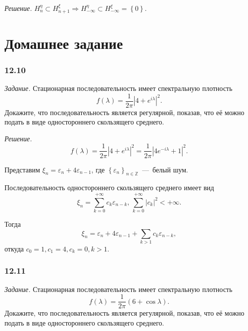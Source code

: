 \textit{Решение.}
$H_n^{ \eta } \subset H_{n + 1}^{ \xi } \Rightarrow
  H_{-\infty }^{ \eta } \subset H_{-\infty }^{ \xi } = \left\{ 0 \right\} $.

\section*{Домашнее задание}

\subsubsection*{12.10}

\textit{Задание.}
Стационарная последовательность имеет спектральную плотность
\begin{equation*}
  f \left( \lambda \right) =
  \frac{1}{2 \pi } \left| 4 + e^{i \lambda } \right|^2.
\end{equation*}
Докажите, что последовательность является регулярной, показав,
что её можно подать в виде одностороннего скользящего среднего.

\textit{Решение.}
\begin{equation*}
  f \left( \lambda \right) =
  \frac{1}{2 \pi } \left| 4 + e^{i \lambda } \right|^2 =
  \frac{1}{2 \pi } \left| 4e^{-i \lambda } + 1 \right|^2.
\end{equation*}

Представим $ \xi_n = \varepsilon_n + 4 \varepsilon_{n - 1}$,
где $ \left\{ \varepsilon_n \right\}_{n \in \mathbb{Z}}$~---~белый шум.

Последовательность одностороннего скользящего среднего имеет вид
\begin{equation*}
  \xi_n = \sum \limits_{k = 0}^{+\infty } c_k \varepsilon_{n - k}, \,
  \sum \limits_{k = 0}^{+\infty } \left| c_k \right|^2 < +\infty.
\end{equation*}

Тогда
\begin{equation*}
  \xi_n =
  \varepsilon_n + 4 \varepsilon_{n - 1} + \sum \limits_{k > 1} c_k \varepsilon_{n - k},
\end{equation*}
откуда $c_0 = 1, c_1 = 4, c_k = 0, k > 1$.

\subsubsection*{12.11}

\textit{Задание.}
Стационарная последовательность имеет спектральную плотность
\begin{equation*}
  f \left( \lambda \right) =
  \frac{1}{2 \pi } \left( 6 + \cos \lambda \right).
\end{equation*}
Докажите, что последовательность является регулярной, показав,
что её можно подать в виде одностороннего скользящего среднего.


